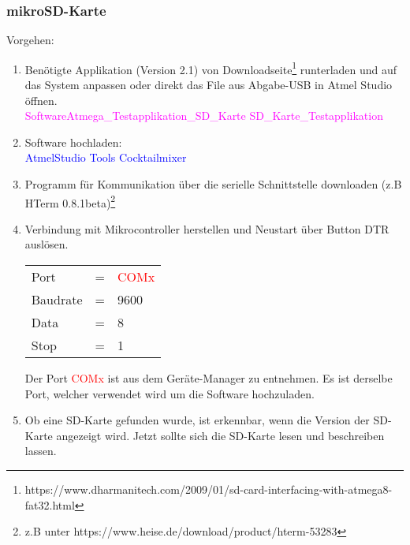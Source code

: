 \subsubsection{mikroSD-Karte}
\label{subsubsec:Inbetriebnahme_mikroSD_Karte}

Vorgehen:
\begin{enumerate}
\item Benötigte Applikation (Version 2.1) von Downloadseite\footnote{https://www.dharmanitech.com/2009/01/sd-card-interfacing-with-atmega8-fat32.html} runterladen und auf das System anpassen oder direkt das File aus Abgabe-USB in Atmel Studio öffnen.\\
\textcolor{magenta}{Software\textrightarrow Atmega\_Testapplikation\_SD\_Karte \textrightarrow SD\_Karte\_Testapplikation}\\

\item Software hochladen:\\
\textcolor{blue}{AtmelStudio \textrightarrow Tools \textrightarrow Cocktailmixer}\\

\item Programm für Kommunikation über die serielle Schnittstelle downloaden (z.B HTerm 0.8.1beta)\footnote{z.B unter https://www.heise.de/download/product/hterm-53283}\\
\item Verbindung mit Mikrocontroller herstellen und Neustart über Button DTR auslösen.\\

\begin{table}[h!]
\center
\begin{tabular}{lcl}
Port & = & \textcolor{red}{COMx} \\
Baudrate & = & 9600 \\
Data & = & 8 \\
Stop & = & 1 \\
\end{tabular}
\end{table}

Der Port \textcolor{red}{COMx} ist aus dem Geräte-Manager zu entnehmen. Es ist derselbe Port, welcher verwendet wird um die Software hochzuladen.\\

\item Ob eine SD-Karte gefunden wurde, ist erkennbar, wenn die Version der SD-Karte angezeigt wird. Jetzt sollte sich die SD-Karte lesen und beschreiben lassen.

\end{enumerate}
